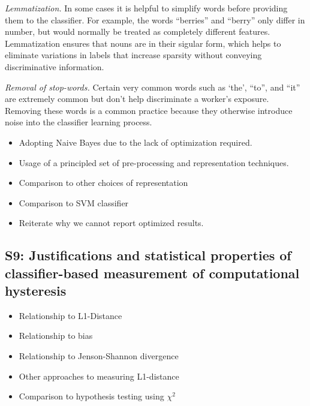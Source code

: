 \documentclass[12pt]{article}
\begin{document}
	\textit{Lemmatization.}  In some cases it is helpful to simplify words 
	before providing them to the classifier.  For example, the words 
	``berries'' and ``berry'' only differ in number, but would normally be
	treated as completely different features.  Lemmatization ensures that
	nouns are in their sigular form, which helps to eliminate variations in
	labels that increase sparsity without conveying discriminative 
	information.

	\textit{Removal of stop-words.}  Certain very common words such as `the',
	``to'', and ``it'' are extremely common but don't help discriminate a 
	worker's exposure.  Removing these words is a common practice because
	they otherwise introduce noise into the classifier learning process.




\begin{itemize}
	\item{Adopting Naive Bayes due to the lack of optimization required.}
	\item{
		Usage of a principled set of pre-processing and representation 
		techniques.
	}
	\item{
		Comparison to other choices of representation
	}
	\item{
		Comparison to SVM classifier
	}
	\item{
		Reiterate why we cannot report optimized results.
	}
\end{itemize}

\subsection*{S9: Justifications and statistical properties of classifier-based measurement of computational hysteresis}
\begin{itemize}
	\item{Relationship to L1-Distance}
	\item{Relationship to bias}
	\item{Relationship to Jenson-Shannon divergence}
	\item{Other approaches to measuring L1-distance}
	\item{Comparison to hypothesis testing using $\chi^2$}
\end{itemize}
\end{document}
